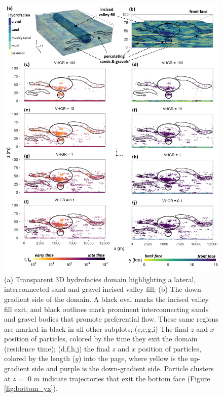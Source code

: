 \begin{figure}[H]
  \includegraphics[width=\textwidth]{ch4_figs/krf_front_face_ivf_low_res-01.png}
  \caption{(a) Transparent 3D hydrofacies domain highlighting a lateral, interconnected sand and gravel incised valley fill; (b) The down-gradient side of the domain. A black oval marks the incised valley fill exit, and black outlines mark prominent interconnecting sands and gravel bodies that promote preferential flow. These same regions are marked in black in all other subplots; (c,e,g,i) The final $z$ and $x$ position of particles, colored by the time they exit the domain (residence time); (d,f,h,j) the final $z$ and $x$ position of particles, colored by the length ($y$) into the page, where yellow is the up-gradient side and purple is the down-gradient side. Particle clusters at $z =$ 0 $m$ indicate trajectories that exit the bottom face (Figure \ref{fig:bottom_yx}).}
  \label{fig:ivf_xz}
\end{figure}



